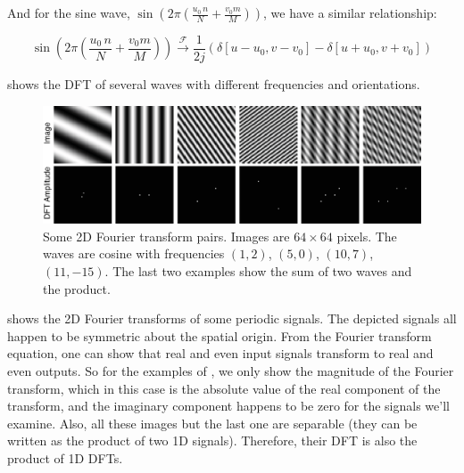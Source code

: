And for the sine wave, $\sin{ \left( 2\pi \left( \frac{u_0\, n}{N} + \frac{v_0 m}{M} \right) \right) }$, we have a  similar relationship:


\begin{equation}
\sin{ \left( 2\pi \left( \frac{u_0\, n}{N} + \frac{v_0 m}{M} \right) \right) } 
\xrightarrow{\mathscr{F}} 
\frac{1}{2j} \left( \delta \left[u-u_0, v-v_0 \right] - \delta \left[u+u_0, v+v_0 \right]\right)
\end{equation}

\Fig{\ref{fig:2ddftexampleswaves}} shows the DFT of several waves with different frequencies and orientations. 


\begin{figure}[t]
\centerline{
\includegraphics[width=1\linewidth]{figures/Image_processing_fourier/DFT_examples_waves.eps}
}
\caption{Some 2D Fourier transform pairs. Images are $64 \times 64$ pixels. The waves are cosine with frequencies $(1,2)$, $(5,0)$, $(10,7)$, $(11,-15)$. The last two examples show the sum of two waves and the product.  
} 
\label{fig:2ddftexampleswaves}
\end{figure}


\Fig{\ref{fig:2ddftexamples}} shows the 2D Fourier transforms of
some periodic signals.  The depicted signals all happen to be symmetric
about the spatial origin.  From the Fourier transform equation, one
can show that real and even input signals transform to real and even
outputs.  So for the examples of \fig{\ref{fig:2ddftexamples}}, we only
show the magnitude of the Fourier transform, which in this case is the
absolute value of the real component of the transform, and the
imaginary component happens to be zero for the signals we'll examine. Also, all these images but the last one are separable (they can be written as the product of two 1D signals). Therefore, their DFT is also the product of 1D DFTs.


